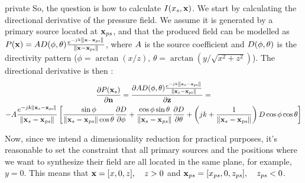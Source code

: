 \begin{shownto}{private}
So, the question is how to calculate $I(x_s, \PosTheo)$. We start by calculating the directional derivative of the pressure field. We assume it is generated by a primary source located at $\PosTheo[primarySource]$, and that the produced field can be modelled as $P(\PosTheo) = \coef \Diag(\phi, \theta) \GreenFunc[{\PosTheo - \PosTheo[primarySource]}]$, where $\coef$ is the source coefficient and $\Diag(\phi, \theta)$ is the directivity pattern ($\phi = \arctan(x/z)$, $\theta = \arctan(y/\sqrt{x^2 + z^2})$). The directional derivative is then \cite{Verheijen}:
\begin{multline}
\frac{\partial P(\PosTheo[surface])}{\partial \mathbf{n}} = \frac{\partial \coef \Diag(\phi, \theta) \GreenFunc[{\PosTheo[surface] - \PosTheo[primarySource]}]}{\partial \mathbf{z}} = \\ -A \GreenFunc[{\PosTheo[surface] - \PosTheo[primarySource]}] \left[ \frac{\sin\phi}{\norm{\PosTheo[surface] - \PosTheo[primarySource]}\cos\theta}\frac{\partial\Diag}{\partial\phi} + \frac{\cos\phi \sin\theta}{\norm{\PosTheo[surface] - \PosTheo[primarySource]}} \frac{\partial\Diag}{\partial\theta} + \left(jk + \frac{1}{\norm{\PosTheo[surface] - \PosTheo[primarySource]}}\right) \Diag \cos\phi \cos\theta \right]
\label{derivPressure}
\end{multline}


Now, since we intend a dimensionality reduction for practical purposes, it's reasonable to set the constraint that all primary sources and the positions where we want to synthesize their field are all located in the same plane, for example, $y = 0$. This means that $\PosTheo = [x, 0, z],\quad z > 0$ and $\PosTheo[primarySource] = [x_\mathit{ps}, 0, z_\mathit{ps}], \quad z_\mathit{ps} < 0$.


\end{shownto}
